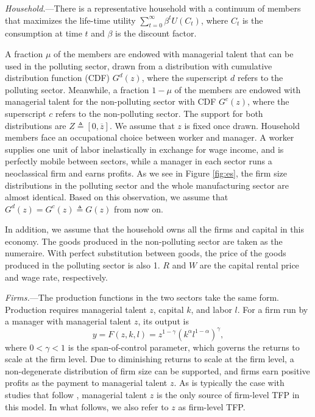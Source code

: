 \documentclass[AEJ]{AEA}
\begin{document}
\textit{Household.}---There is a representative household with a continuum of members that maximizes the life-time utility $\sum_{t=0}^{\infty} \beta^t U(C_t)$, where $C_t$ is the consumption at time $t$ and $\beta$ is the discount factor.

A fraction $\mu$ of the members are endowed with managerial talent that can be used in the polluting sector, drawn from a distribution with cumulative distribution function (CDF) $G^{d}(z)$, where the superscript $d$ refers to the polluting sector. Meanwhile, a fraction $1-\mu$ of the members are endowed with managerial talent for the non-polluting sector with CDF $G^{c}(z)$, where the superscript $c$ refers to the non-polluting sector. The support for both distributions are $Z \triangleq [0,\overline{z}]$. We assume that $z$ is fixed once drawn. Household members face an occupational choice between {worker} and {manager}. A worker supplies one unit of labor inelastically in exchange for wage income, and is perfectly mobile between sectors, while a manager in each sector runs a neoclassical firm and earns profits. As we see in Figure \ref{fig:es}, the firm size distributions in the polluting sector and the whole manufacturing sector are almost identical. Based on this observation, we assume that $G^{d}(z) = G^{c}(z) \triangleq G(z)$ from now on.

In addition, we assume that the household owns all the firms and capital in this economy. The goods produced in the non-polluting sector are taken as the numeraire. With perfect substitution between goods, the price of the goods produced in the polluting sector is also 1. $R$ and $W$ are the capital rental price and wage rate, respectively.

\textit{Firms.}---The production functions in the two sectors take the same form. Production requires managerial talent $z$, capital $k$, and labor $l$. For a firm run by a manager with managerial talent $z$, its output is
\begin{equation*}
    y = F(z,k,l) = z^{1-\gamma} (k^{\alpha}l^{1-\alpha})^{\gamma},
\end{equation*}
where $0<\gamma<1$ is the span-of-control parameter, which governs the returns to scale at the firm level. Due to diminishing returns to scale at the firm level, a non-degenerate distribution of firm size can be supported, and firms earn positive profits as the payment to managerial talent $z$. As is typically the case with studies that follow \citet{Lucas:1978b}, managerial talent $z$ is the only source of firm-level TFP in this model. In what follows, we also refer to $z$ as firm-level TFP.
\end{document}
